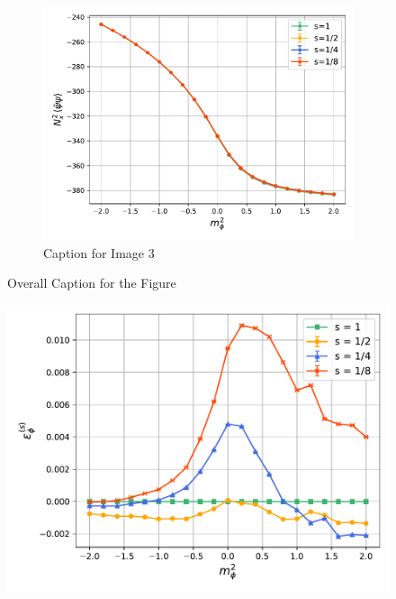 \begin{figure}
\begin{subfigure}[b]{0.45\textwidth}
        \includegraphics[width=\textwidth]{figures/cooling/mass_scan/condensate.pdf}
        \caption{Caption for Image 3}
    \end{subfigure}
    \caption{Overall Caption for the Figure}
\end{figure}

\begin{figure}
    \centering
    \includegraphics[scale=0.45]{figures/cooling/mass_scan/deviation.pdf}
    \label{fig:cooling}
\end{figure}

